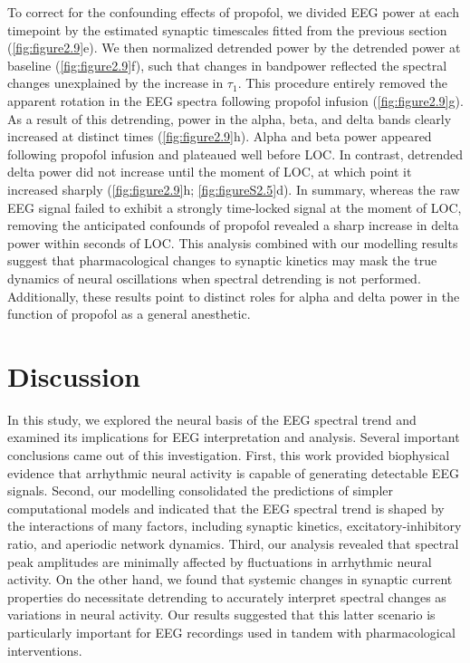 To correct for the confounding effects of propofol, we divided EEG power at each timepoint by the estimated synaptic timescales fitted from the previous section (\autoref{fig:figure2.9}e). We then normalized detrended power by the detrended power at baseline (\autoref{fig:figure2.9}f), such that changes in bandpower reflected the spectral changes unexplained by the increase in $\tau_1$. This procedure entirely removed the apparent rotation in the EEG spectra following propofol infusion (\autoref{fig:figure2.9}g). As a result of this detrending, power in the alpha, beta, and delta bands clearly increased at distinct times (\autoref{fig:figure2.9}h). Alpha and beta power appeared following propofol infusion and plateaued well before LOC. In contrast, detrended delta power did not increase until the moment of LOC, at which point it increased sharply (\autoref{fig:figure2.9}h; \autoref{fig:figureS2.5}d). In summary, whereas the raw EEG signal failed to exhibit a strongly time-locked signal at the moment of LOC, removing the anticipated confounds of propofol revealed a sharp increase in delta power within seconds of LOC. This analysis combined with our modelling results suggest that pharmacological changes to synaptic kinetics may mask the true dynamics of neural oscillations when spectral detrending is not performed. Additionally, these results point to distinct roles for alpha and delta power in the function of propofol as a general anesthetic. 

\section{Discussion}
In this study, we explored the neural basis of the EEG spectral trend and examined its implications for EEG interpretation and analysis. Several important conclusions came out of this investigation. First, this work provided biophysical evidence that arrhythmic neural activity is capable of generating detectable EEG signals. Second, our modelling consolidated the predictions of simpler computational models \cite{Gao2017, Chaudhuri2018} and indicated that the EEG spectral trend is shaped by the interactions of many factors, including synaptic kinetics, excitatory-inhibitory ratio, and aperiodic network dynamics. Third, our analysis revealed that spectral peak amplitudes are minimally affected by fluctuations in arrhythmic neural activity. On the other hand, we found that systemic changes in synaptic current properties do necessitate detrending to accurately interpret spectral changes as variations in neural activity. Our results suggested that this latter scenario is particularly important for EEG recordings used in tandem with pharmacological interventions. 

